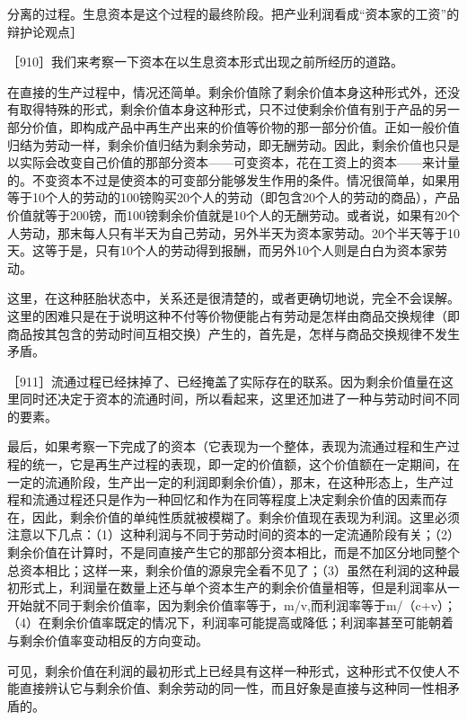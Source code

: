 
分离的过程。生息资本是这个过程的最终阶段。把产业利润看成“资本家的工资”的辩护论观点］

［910］我们来考察一下资本在以生息资本形式出现之前所经历的道路。

在直接的生产过程中，情况还简单。剩余价值除了剩余价值本身这种形式外，还没有取得特殊的形式，剩余价值本身这种形式，只不过使剩余价值有别于产品的另一部分价值，即构成产品中再生产出来的价值等价物的那一部分价值。正如一般价值归结为劳动一样，剩余价值归结为剩余劳动，即无酬劳动。因此，剩余价值也只是以实际会改变自己价值的那部分资本——可变资本，花在工资上的资本——来计量的。不变资本不过是使资本的可变部分能够发生作用的条件。情况很简单，如果用等于10个人的劳动的100镑购买20个人的劳动（即包含20个人的劳动的商品），产品价值就等于200镑，而100镑剩余价值就是10个人的无酬劳动。或者说，如果有20个人劳动，那末每人只有半天为自己劳动，另外半天为资本家劳动。20个半天等于10天。这等于是，只有10个人的劳动得到报酬，而另外10个人则是白白为资本家劳动。

这里，在这种胚胎状态中，关系还是很清楚的，或者更确切地说，完全不会误解。这里的困难只是在于说明这种不付等价物便能占有劳动是怎样由商品交换规律（即商品按其包含的劳动时间互相交换）产生的，首先是，怎样与商品交换规律不发生矛盾。

［911］流通过程已经抹掉了、已经掩盖了实际存在的联系。因为剩余价值量在这里同时还决定于资本的流通时间，所以看起来，这里还加进了一种与劳动时间不同的要素。

最后，如果考察一下完成了的资本（它表现为一个整体，表现为流通过程和生产过程的统一，它是再生产过程的表现，即一定的价值额，这个价值额在一定期间，在一定的流通阶段，生产出一定的利润即剩余价值），那末，在这种形态上，生产过程和流通过程还只是作为一种回忆和作为在同等程度上决定剩余价值的因素而存在，因此，剩余价值的单纯性质就被模糊了。剩余价值现在表现为利润。这里必须注意以下几点：（1）这种利润与不同于劳动时间的资本的一定流通阶段有关；（2）剩余价值在计算时，不是同直接产生它的那部分资本相比，而是不加区分地同整个总资本相比；这样一来，剩余价值的源泉完全看不见了；（3）虽然在利润的这种最初形式上，利润量在数量上还与单个资本生产的剩余价值量相等，但是利润率从一开始就不同于剩余价值率，因为剩余价值率等于，m/v,而利润率等于m/（c+v）；（4）在剩余价值率既定的情况下，利润率可能提高或降低；利润率甚至可能朝着与剩余价值率变动相反的方向变动。

可见，剩余价值在利润的最初形式上已经具有这样一种形式，这种形式不仅使人不能直接辨认它与剩余价值、剩余劳动的同一性，而且好象是直接与这种同一性相矛盾的。

